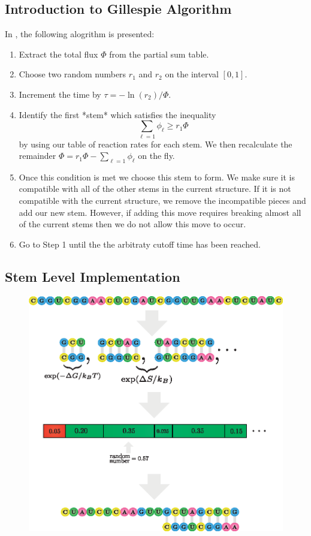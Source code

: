 \documentclass[11pt]{article}
\begin{document}
\subsection{Introduction to Gillespie Algorithm}
In \cite{10.1093/nar/gkv480}, the following alogrithm is presented:
\begin{enumerate}
\item Extract the total flux $\Phi$ from the partial sum table.
\item Choose two random numbers $r_{1}$ and $r_{2}$ on the interval $[0, 1]$.
\item  Increment the time by $\tau = - \ln(r_{2})/\Phi$.
\item Identify the first *stem* which satisfies the inequality $$ \sum_{\ell =1} \phi_{\ell} \geq r_{1} \Phi$$ by using our table of reaction rates for each stem. We then recalculate the remainder $\Phi = r_{1} \Phi - \sum_{\ell = 1} \phi_{\ell}$ on the fly.
\item Once this condition is met we choose this stem to form. We make sure it is compatible with all of the other stems in the current structure. If it is not compatible with the current structure, we remove the incompatible pieces and add our new stem. However, if adding this move requires breaking almost all of the current stems then we do not allow this move to occur.
\item Go to Step 1 until the the arbitraty cutoff time has been reached.
\end{enumerate}

\subsection{Stem Level Implementation}

\begin{figure}[H]
\centering
\includegraphics{fig/rna_gillespie_algo}
\end{figure}
\end{document}
